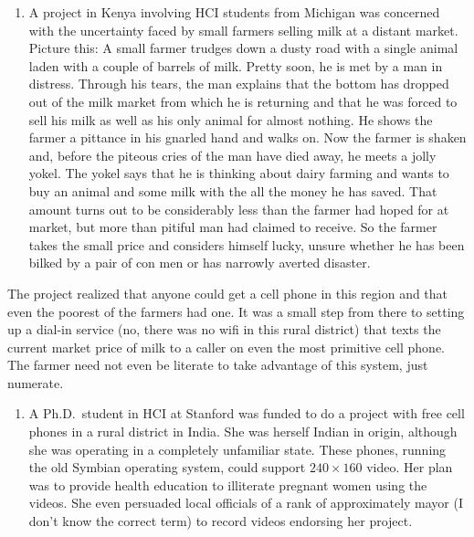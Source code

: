 \begin{enumerate}
\def\labelenumi{(\arabic{enumi})}
\tightlist
\item
  A project in Kenya involving HCI students from Michigan was concerned
  with the uncertainty faced by small farmers selling milk at a distant
  market. Picture this: A small farmer trudges down a dusty road with a
  single animal laden with a couple of barrels of milk. Pretty soon, he
  is met by a man in distress. Through his tears, the man explains that
  the bottom has dropped out of the milk market from which he is
  returning and that he was forced to sell his milk as well as his only
  animal for almost nothing. He shows the farmer a pittance in his
  gnarled hand and walks on. Now the farmer is shaken and, before the
  piteous cries of the man have died away, he meets a jolly yokel. The
  yokel says that he is thinking about dairy farming and wants to buy an
  animal and some milk with the all the money he has saved. That amount
  turns out to be considerably less than the farmer had hoped for at
  market, but more than pitiful man had claimed to receive. So the
  farmer takes the small price and considers himself lucky, unsure
  whether he has been bilked by a pair of con men or has narrowly
  averted disaster.
\end{enumerate}

The project realized that anyone could get a cell phone in this region
and that even the poorest of the farmers had one. It was a small step
from there to setting up a dial-in service (no, there was no wifi in
this rural district) that texts the current market price of milk to a
caller on even the most primitive cell phone. The farmer need not even
be literate to take advantage of this system, just numerate.

\begin{enumerate}
\def\labelenumi{(\arabic{enumi})}
\setcounter{enumi}{1}
\tightlist
\item
  A Ph.D.~student in HCI at Stanford was funded to do a project with
  free cell phones in a rural district in India. She was herself Indian
  in origin, although she was operating in a completely unfamiliar
  state. These phones, running the old Symbian operating system, could
  support \(240\times160\) video. Her plan was to provide health
  education to illiterate pregnant women using the videos. She even
  persuaded local officials of a rank of approximately mayor (I don't
  know the correct term) to record videos endorsing her project.
\end{enumerate}

